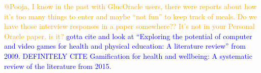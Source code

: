 \textcolor{orange}{@Pooja, I know in the past with GlucOracle users, there were reports about how it's too many things to enter and maybe ``not fun'' to keep track of meals. Do we have those interview responses in a paper somewhere?? It's not in your Personal Oracle paper, is it?} \textcolor{blue}{\cite{papastergiou2009exploring} gotta cite and look at ``Exploring the potential of computer and video games for health and physical education: A literature review'' from 2009. DEFINITELY CITE Gamification for health and wellbeing: A systematic review of the literature from 2015.~\cite{johnson2016gamification}}






